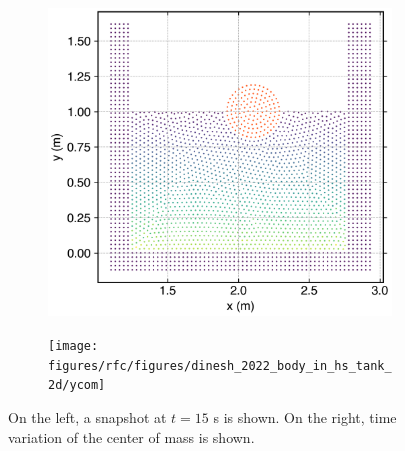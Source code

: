 \begin{figure}[tpb]
  \centering
  \begin{subfigure}{0.48\textwidth}
    \centering
    \includegraphics[width=1.0\textwidth]{figures/rfc/figures/dinesh_2022_body_in_hs_tank_2d/time11}
  \end{subfigure}
  \begin{subfigure}{0.48\textwidth}
    \centering
    \texttt{[image: figures/rfc/figures/dinesh\_2022\_body\_in\_hs\_tank\_2d/ycom]}
  \end{subfigure}
  \caption{
    On the left, a snapshot at $t=15$ s is shown. On the right,
    time variation of the center of mass is shown.}
\label{fig:snapshots-rising-solid-in-water}
\end{figure}
